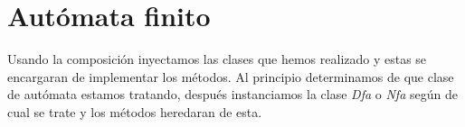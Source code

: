 \documentclass{article}
\begin{document}
    \section{Autómata finito}\label{sec:autómata-finito}
    Usando la composición inyectamos las clases que hemos realizado y estas se encargaran de implementar los métodos.
    Al principio determinamos de que clase de autómata estamos tratando, después instanciamos la clase \textit{Dfa} o
    \textit{Nfa} según de cual se trate y los métodos heredaran de esta.
\end{document}
